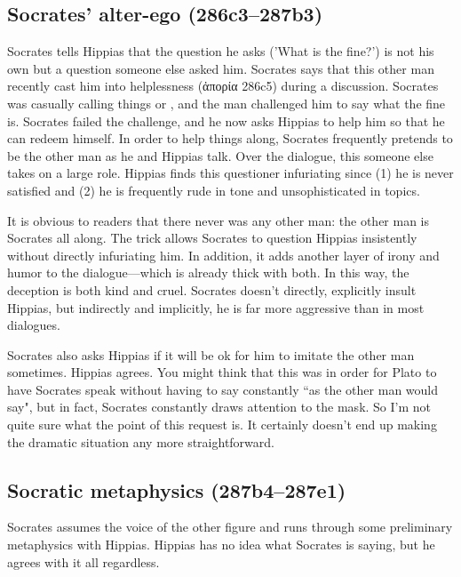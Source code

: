 \documentclass[11pt]{article}
\begin{document}
\subsection{Socrates' alter-ego (286c3--287b3)}

Socrates tells Hippias that the question he asks ('What is the fine?') is not his own but a question someone else asked him.  Socrates says that this other man recently cast him into helplessness (ἀπορία 286c5) during a discussion.  Socrates was casually calling things  or , and the man challenged him to say what the fine is.  Socrates failed the challenge, and he now asks Hippias to help him so that he can redeem himself.  In order to help things along, Socrates frequently pretends to be the other man as he and Hippias talk.  Over the dialogue, this someone else takes on a large role.  Hippias finds this questioner infuriating since (1) he is never satisfied and (2) he is frequently rude in tone and unsophisticated in topics.

It is obvious to readers that there never was any other man: the other man is Socrates all along.  The trick allows Socrates to question Hippias insistently without directly infuriating him.  In addition, it adds another layer of irony and humor to the dialogue---which is already thick with both.  In this way, the deception is both kind and cruel.  Socrates doesn't directly, explicitly insult Hippias, but indirectly and implicitly, he is far more aggressive than in most dialogues.

Socrates also asks Hippias if it will be ok for him to imitate the other man sometimes.  Hippias agrees.  You might think that this was in order for Plato to have Socrates speak without having to say constantly ``as the other man would say", but in fact, Socrates constantly draws attention to the mask.  So I'm not quite sure what the point of this request is.  It certainly doesn't end up making the dramatic situation any more straightforward.


\subsection{Socratic metaphysics (287b4--287e1)}

Socrates assumes the voice of the other figure and runs through some preliminary metaphysics with Hippias.  Hippias has no idea what Socrates is saying, but he agrees with it all regardless.
\end{document}
